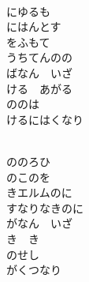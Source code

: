 \documentclass[10pt,b5j]{tarticle} %
\begin{document}
\begin{enumerate}
\begin{minipage}[c]{\blocksize}
    \end{minipage}
    \begin{minipage}[c]{\blocksize}
        
        \vspace{\linespace}
        \item~\\
        にゆるも\\
        にはんとす\\
        をふもて\\
        うちてんのの\\
        ばなん　いざ\\
        ける　あがる\\
        ののは\\
        けるにはくなり
        
    \end{minipage}
    \begin{minipage}[c]{\blocksize}
        
        \vspace{\linespace}
        \item~\\
        ののろひ\\
        のこのを\\
        きエルムのに\\
        すなりなきのに\\
        がなん　いざ\\
        き　き\\
        のせし\\
        がくつなり
    
    \end{minipage}
\end{enumerate} %
\end{document}
